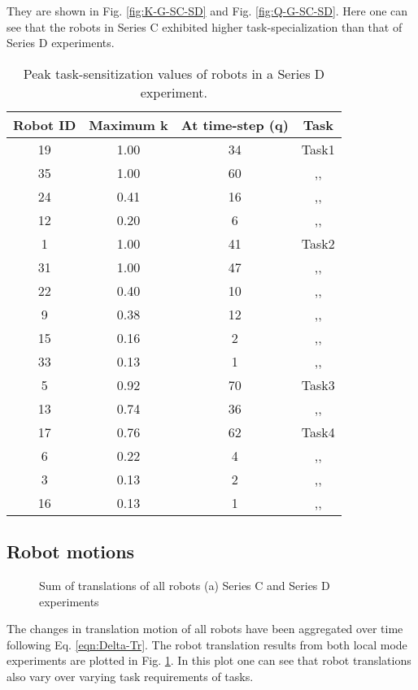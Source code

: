 They are shown in Fig. \ref{fig:K-G-SC-SD} and Fig. \ref{fig:Q-G-SC-SD}. Here one can see that the robots in Series C exhibited higher task-specialization than that of Series D experiments.
\begin{table}[H]
\centering
\caption{Peak task-sensitization values of robots in a Series D experiment.}
\begin{tabular}{|c|c|c|c|}
\hline\textbf{ Robot ID} & \textbf{Maximum k} & \textbf{At time-step (q)} & \textbf{Task} \\
\hline 19 & 1.00 & 34 & Task1\\
\hline 35 & 1.00 & 60 & ,,\\
\hline 24 & 0.41 & 16 & ,,\\
\hline 12 & 0.20 & 6 & ,,\\  
\hline 1 & 1.00 & 41 & Task2\\
\hline 31 & 1.00 & 47 & ,,\\
\hline 22 & 0.40 & 10 & ,,\\
\hline 9 & 0.38 & 12 & ,,\\
\hline 15 & 0.16 & 2 & ,,\\
\hline 33 & 0.13 & 1 & ,,\\ 
\hline 5 & 0.92 & 70 & Task3\\ 
\hline 13 & 0.74 & 36 & ,,\\
\hline 17 & 0.76 & 62 & Task4\\ 
\hline 6 & 0.22 & 4 & ,,\\ 
\hline 3 & 0.13 & 2 & ,,\\
\hline 16 & 0.13 & 1 & ,,\\ 
\hline 
\end{tabular}
\label{table:K-Q-SD} 
\end{table}
\subsection*{Robot motions}
\begin{figure}[H]
\centering
\hspace*{0.5cm}
\newline
\centering
{}
\caption{\small Sum of translations of all robots (a) Series C and Series D experiments }
\label{fig:translation-SC-SD} 
\end{figure}
The changes in translation motion of all robots have been aggregated over time following Eq. \ref{eqn:Delta-Tr}. The robot translation results from both local mode experiments are plotted in Fig. \ref{fig:translation-SC-SD}. In this plot one can see that robot translations also vary over varying task requirements of tasks. 
